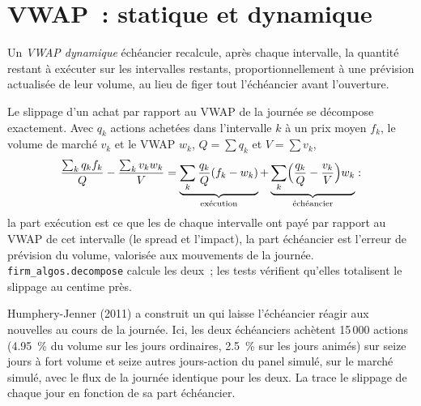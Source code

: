 \section{VWAP~: statique et dynamique}

\begin{definition}\label{def:mx:benchmark-algorithms:dvwap}
Un \emph{VWAP dynamique} échéancier recalcule, après chaque intervalle, la quantité restant à exécuter sur les intervalles restants, proportionnellement à une
prévision actualisée de leur volume, au lieu de figer tout l'échéancier avant l'ouverture.
\end{definition}

Le slippage d'un achat par rapport au VWAP de la journée se décompose exactement. Avec $q_k$ actions achetées dans l'intervalle $k$ à un prix moyen $f_k$, le volume de marché $v_k$
et le VWAP $w_k$, $Q=\sum q_k$ et $V=\sum v_k$,
\[
\frac{\sum_kq_kf_k}{Q}-\frac{\sum_kv_kw_k}{V}=\underbrace{\sum_k\frac{q_k}{Q}(f_k-w_k)}_{\text{exécution}}+\underbrace{\sum_k\Bigl(\frac{q_k}{Q}-\frac{v_k}{V}\Bigr)w_k}_{\text{échéancier}}:
\]
la part exécution est ce que les  de chaque intervalle ont payé par rapport au VWAP de cet intervalle (le spread et l'impact), la part échéancier est l'erreur de prévision du
volume, valorisée aux mouvements de la journée. \texttt{firm\_algos.decompose} calcule les deux~; les tests vérifient qu'elles totalisent le slippage au
centime près.

\label{lst:mx:benchmark-algorithms:schedules}

Humphery-Jenner (2011) a construit un  qui laisse l'échéancier réagir aux nouvelles au cours de la journée. Ici, les deux échéanciers achètent 15\,000 actions (4.95~\% du volume sur
les jours ordinaires, 2.5~\% sur les jours animés) sur seize jours à fort volume et seize autres jours-action du panel simulé, sur le marché simulé, avec
le flux de la journée identique pour les deux.
La  trace le slippage de chaque jour en fonction de sa part échéancier.

